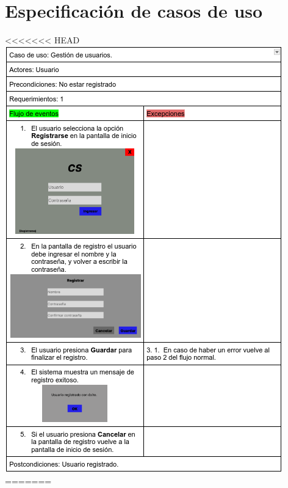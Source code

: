 \documentclass{article}
\begin{document}
\section{Especificación de casos de uso}
<<<<<<< HEAD
	\includegraphics[width=0.95\linewidth]{imagenes/especificacion_usuario.png}
=======
\end{document}
